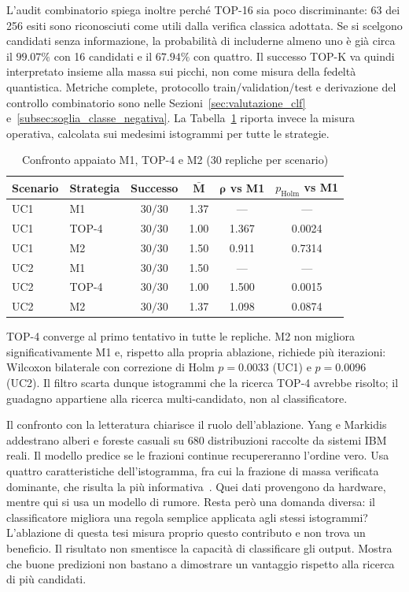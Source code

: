\begin{onehalfspace}
L'audit combinatorio spiega inoltre perché TOP-16 sia poco discriminante:
63 dei 256 esiti sono riconosciuti come utili dalla verifica classica
adottata. Se si scelgono candidati senza informazione, la probabilità di
includerne almeno uno è già circa il $99.07\%$ con 16 candidati e il
$67.94\%$ con quattro. Il successo TOP-K va quindi interpretato insieme
alla massa sui picchi, non come misura della fedeltà quantistica.
Metriche complete, protocollo train/validation/test e derivazione del
controllo combinatorio sono nelle Sezioni~\ref{sec:valutazione_clf}
e~\ref{subsec:soglia_classe_negativa}. La
Tabella~\ref{tab:riepilogo_rho} riporta invece la misura operativa,
calcolata sui medesimi istogrammi per tutte le strategie.

\begin{table}[H]
\centering
\caption{Confronto appaiato M1, TOP-4 e M2 ($30$ repliche per scenario)}
\label{tab:riepilogo_m1}
\label{tab:riepilogo_rho}
\begin{tabular}{llcccc}
\toprule
\textbf{Scenario} & \textbf{Strategia} & \textbf{Successo} &
$\boldsymbol{\bar M}$ & $\boldsymbol{\rho}$ vs M1 &
\textbf{$p_{\mathrm{Holm}}$ vs M1} \\
\midrule
UC1 & M1 & $30/30$ & 1.37 & --- & --- \\
UC1 & TOP-4 & $30/30$ & 1.00 & 1.367 & 0.0024 \\
UC1 & M2 & $30/30$ & 1.50 & 0.911 & 0.7314 \\
\midrule
UC2 & M1 & $30/30$ & 1.50 & --- & --- \\
UC2 & TOP-4 & $30/30$ & 1.00 & 1.500 & 0.0015 \\
UC2 & M2 & $30/30$ & 1.37 & 1.098 & 0.0874 \\
\bottomrule
\end{tabular}
\end{table}

TOP-4 converge al primo tentativo in tutte le repliche. M2 non migliora
significativamente M1 e, rispetto alla propria ablazione, richiede più
iterazioni: Wilcoxon bilaterale con correzione di Holm
$p=0.0033$ (UC1) e $p=0.0096$ (UC2). Il filtro scarta dunque istogrammi
che la ricerca TOP-4 avrebbe risolto; il guadagno appartiene alla ricerca
multi-candidato, non al classificatore.

Il confronto con la letteratura chiarisce il ruolo dell'ablazione. Yang e Markidis addestrano alberi e foreste casuali su $680$ distribuzioni raccolte da sistemi \ac{IBM} reali. Il modello predice se le frazioni continue recupereranno l'ordine vero. Usa quattro caratteristiche dell'istogramma, fra cui la frazione di massa verificata dominante, che risulta la più informativa~\cite{yang2026}. Quei dati provengono da hardware, mentre qui si usa un modello di rumore. Resta però una domanda diversa: il classificatore migliora una regola semplice applicata agli stessi istogrammi? L'ablazione di questa tesi misura proprio questo contributo e non trova un beneficio. Il risultato non smentisce la capacità di classificare gli output. Mostra che buone predizioni non bastano a dimostrare un vantaggio rispetto alla ricerca di più candidati.


\end{onehalfspace}
